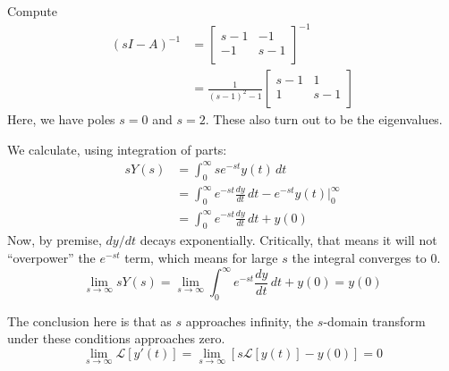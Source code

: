 \documentclass[a4paper]{article}
\begin{document}
Compute
\begin{align*}
	\!\left( sI - A \right)^{-1} & = \begin{bmatrix}
		s - 1 & -1 \\
		-1 & s - 1 \\
	\end{bmatrix}^{-1} \\
	 & = \frac{1}{\!\left( s - 1 \right)^{2} - 1}
	 \begin{bmatrix}
	 	s - 1 & 1 \\
	 	1 & s - 1 \\
	 \end{bmatrix}
\end{align*}
Here, we have poles \( s = 0 \) and \( s = 2 \). These also turn out to be the eigenvalues.

\vspace{12pt}


We calculate, using integration of parts:
\begin{align*}
	sY \!\left( s \right) & = \int^{\infty}_{0} se^{-st} y \!\left( t \right) \, dt \\
	 & = \int^{\infty}_{0} e^{-st}\frac{d y}{d t} \, dt - e^{-st}y \!\left( t \right) \Big|^{\infty}_{0} \\ 
	 & = \int^{\infty}_{0} e^{-st}\frac{d y}{d t} \, dt + y \!\left( 0 \right) 
\end{align*}
Now, by premise, \( dy / dt \) decays exponentially. Critically, that means it will not ``overpower'' the \( e^{-st} \) term, which means for large \( s \) the integral converges to \( 0 \).
\[
	\lim\limits_{s \to \infty} s Y \!\left( s \right) = \lim\limits_{s \to \infty} \int^{\infty}_{0} e^{-st}\frac{d y}{d t} \, dt + y \!\left( 0 \right) = y \!\left( 0 \right)
\]

The conclusion here is that as \( s \) approaches infinity, the \( s \)-domain transform under these conditions approaches zero.
\[
	\lim\limits_{s \to \infty} \mathcal{L}\!\left[ y'\!\left( t \right) \right] = \lim\limits_{s \to \infty} \!\left[ s \mathcal{L}\!\left[ y \!\left( t \right) \right] - y \!\left( 0 \right) \right] = 0 
\]

\end{document}

